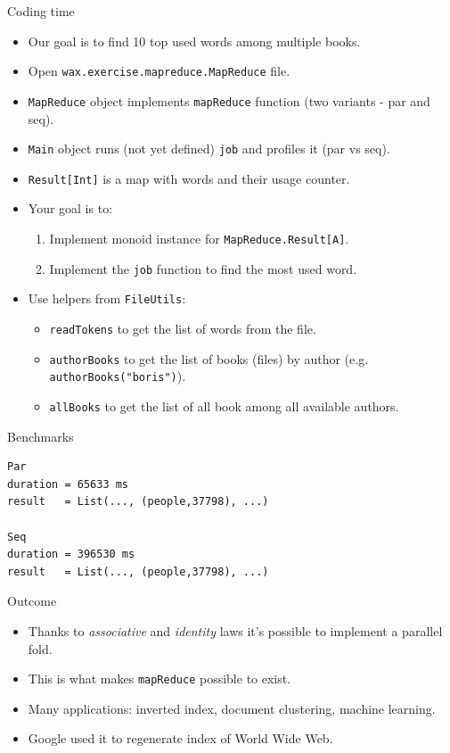 \documentclass[presentation,aspectratio=169,smaller]{beamer}
\begin{document}
\begin{frame}[label={sec:org2f70d28},fragile]{Coding time}
 \begin{itemize}
\item <1-> Our goal is to find 10 top used words among multiple books.
\item <2-> Open \texttt{wax.exercise.mapreduce.MapReduce} file.
\item <3-> \texttt{MapReduce} object implements \texttt{mapReduce} function (two variants - par and
seq).
\item <4-> \texttt{Main} object runs (not yet defined) \texttt{job} and profiles it (par vs seq).
\item <5-> \texttt{Result[Int]} is a map with words and their usage counter.
\item <6-> Your goal is to:
\begin{enumerate}
\item Implement monoid instance for \texttt{MapReduce.Result[A]}.
\item Implement the \texttt{job} function to find the most used word.
\end{enumerate}
\item <7-> Use helpers from \texttt{FileUtils}:
\begin{itemize}
\item \texttt{readTokens} to get the list of words from the file.
\item \texttt{authorBooks} to get the list of books (files) by author (e.g.
\texttt{authorBooks("boris")}).
\item \texttt{allBooks} to get the list of all book among all available authors.
\end{itemize}
\end{itemize}
\end{frame}

\begin{frame}[label={sec:orga4c3d4e},fragile]{Benchmarks}
 \begin{verbatim}
Par
duration = 65633 ms
result   = List(..., (people,37798), ...)

Seq
duration = 396530 ms
result   = List(..., (people,37798), ...)
\end{verbatim}
\end{frame}

\begin{frame}[label={sec:org3105974},fragile]{Outcome}
 \begin{itemize}
\item <1-> Thanks to \emph{associative} and \emph{identity} laws it's possible to implement a
parallel fold.
\item <2-> This is what makes \texttt{mapReduce} possible to exist.
\item <3-> Many applications: inverted index, document clustering, machine learning.
\item <4-> Google used it to regenerate index of World Wide Web.
\end{itemize}
\end{frame}
\end{document}
